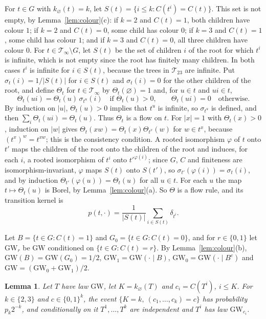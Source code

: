 \documentclass[11pt]{amsart}
\newtheorem{lemma}{Lemma}
\theoremstyle{remark}
\numberwithin{equation}{section}
\newcommand{\T}{\mathcal T}
\newcommand{\GW}{\mathrm{GW}}
\begin{document}
For $t\in G$ with $k_\varnothing(t)=k$, let $S(t)=\{i\le k:C(t^i)=C(t)\}$. This set is not empty, by Lemma~\ref{lem:colour}(c): if $k=2$ and $C(t)=1$, both children have colour $1$; if $k=2$ and $C(t)=0$, some child has colour $0$; if $k=3$ and $C(t)=1$, some child has colour $1$; and if $k=3$ and $C(t)=0$, all three children have colour $0$. For $t\in\T_\infty\setminus G$, let $S(t)$ be the set of children $i$ of the root for which $t^i$ is infinite, which is not empty since the root has finitely many children. In both cases $t^i$ is infinite for $i\in S(t)$, because the trees in $\T_{23}$ are infinite. Put $\sigma_t(i)=1/|S(t)|$ for $i\in S(t)$ and $\sigma_t(i)=0$ for the other children of the root, and define $\Theta_t$ for $t\in\T_\infty$ by $\Theta_t(\varnothing)=1$ and, for $u\in t$ and $ui\in t$,
\[
\Theta_t(ui)=\Theta_t(u)\,\sigma_{t^u}(i)\quad\text{if }\Theta_t(u)>0,\qquad \Theta_t(ui)=0\quad\text{otherwise}.
\]
By induction on $|u|$, $\Theta_t(u)>0$ implies that $t^u$ is infinite, so $\sigma_{t^u}$ is defined, and then $\sum_i\Theta_t(ui)=\Theta_t(u)$. Thus $\Theta_t$ is a flow on $t$. For $|x|=1$ with $\Theta_t(x)>0$, induction on $|w|$ gives $\Theta_t(xw)=\Theta_t(x)\Theta_{t^x}(w)$ for $w\in t^x$, because $(t^x)^w=t^{xw}$; this is the consistency condition. A rooted isomorphism $\varphi$ of $t$ onto $t'$ maps the children of the root onto the children of the root and induces, for each $i$, a rooted isomorphism of $t^i$ onto $t'^{\varphi(i)}$; since $G$, $C$ and finiteness are isomorphism-invariant, $\varphi$ maps $S(t)$ onto $S(t')$, so $\sigma_{t'}(\varphi(i))=\sigma_t(i)$, and by induction $\Theta_{t'}(\varphi(u))=\Theta_t(u)$ for all $u\in t$. For each $u$ the map $t\mapsto\Theta_t(u)$ is Borel, by Lemma~\ref{lem:colour}(a). So $\Theta$ is a flow rule, and its transition kernel is
\begin{equation}\label{eq:kernel}
p(t,\cdot)=\frac1{|S(t)|}\sum_{i\in S(t)}\delta_{t^i}.
\end{equation}

Let $B=\{t\in G:C(t)=1\}$ and $G_0=\{t\in G:C(t)=0\}$, and for $r\in\{0,1\}$ let $\GW_r$ be $\GW$ conditioned on $\{t\in G:C(t)=r\}$. By Lemma~\ref{lem:colour}(b), $\GW(B)=\GW(G_0)=1/2$, $\GW_1=\GW(\cdot\mid B)$, $\GW_0=\GW(\cdot\mid B^c)$ and $\GW=(\GW_0+\GW_1)/2$.

\begin{lemma}\label{lem:cond}
Let $T$ have law $\GW$, let $K=k_\varnothing(T)$ and $c_i=C(T^i)$, $i\le K$. For $k\in\{2,3\}$ and $c\in\{0,1\}^k$, the event $\{K=k,\ (c_1,\dots,c_k)=c\}$ has probability $p_k2^{-k}$, and conditionally on it $T^1,\dots,T^k$ are independent and $T^i$ has law $\GW_{c_i}$.
\end{lemma}
\end{document}
